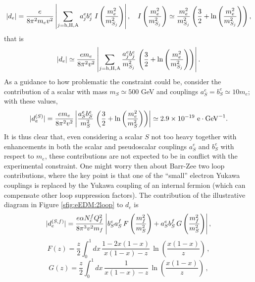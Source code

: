 \documentclass[12pt,a4paper]{article}
\begin{document}
\begin{equation}\label{eq:eEDM:1loop:00}
 \abs{d_e}=\frac{e}{8\pi^2m_e\vev{}^2}\ABS{\sum_{j=\nh,\nH,\nA}a_j^eb_j^e\ I\left(\frac{m_e^2}{m_{S_j}^2}\right)},
 \quad I\left(\frac{m_e^2}{m_{S_j}^2}\right)\simeq \frac{m_e^2}{m_{S_j}^2}\left(\frac{3}{2}+\ln\left(\frac{m_e^2}{m_{S_j}^2}\right)\right),
\end{equation}
that is 
\begin{equation}\label{eq:eEDM:1loop:01}
 |d_e|\simeq\frac{em_e}{8\pi^2v_{}^2}\left|\sum_{j={\rm h},{\rm H},{\rm A}}\frac{a_j^eb_j^e}{m_{S_j}^2}\,\left(\frac{3}{2}+\ln\left(\frac{m_e^2}{m_{S_j}^2}\right)\right)\right|.
\end{equation}
As a guidance to how problematic the constraint could be, consider the contribution of a scalar with mass $m_{S}\simeq 500$ GeV and couplings $a_S^e=b_S^e\simeq 10m_e$; with these values,
\begin{equation}\label{eq:eEDM:1loop:02}
 |d_e^{(S)}|=\frac{em_e}{8\pi^2v_{}^2}\left|\frac{a_S^eb_S^e}{m_{S}^2}\,\left(\frac{3}{2}+\ln\left(\frac{m_e^2}{m_{S}^2}\right)\right)\right|\simeq 2.9\times 10^{-19}\ \text{e}\cdot\text{GeV}^{-1}.
\end{equation}
It is thus clear that, even considering a scalar $S$ not too heavy together with enhancements in both the scalar and pseudoscalar couplings $a_S^e$ and $b_S^e$ with respect to $m_e$, these contributions are not expected to be in conflict with the experimental constraint. One might worry then about Barr-Zee two loop contributions, where the key point is that one of the ``small'' electron Yukawa couplings is replaced by the Yukawa coupling of an internal fermion (which can compensate other loop suppression factors). The contribution of the illustrative diagram in Figure \ref{sfig:eEDM:2loop} to $d_e$ is
\begin{equation}\label{eq:eEDM:2loop:00}
 |d_e^{(S,f)}|=\frac{e\alpha N_c^fQ_f^2}{8\pi^3v_{}^2m_f}\left|b^e_Sa^f_S\,F\left(\frac{m_f^2}{m_S^2}\right)+a^e_Sb^f_S\,G\left(\frac{m_f^2}{m_S^2}\right)\right|,
\end{equation}
%
\begin{equation}
F(z)=\frac{z}{2}\int_0^1 dx\,\frac{1-2x(1-x)}{x(1-x)-z}\,\ln\left(\frac{x(1-x)}{z}\right)\,,
\end{equation}
%
\begin{equation}
G(z)=\frac{z}{2}\int_0^1 dx\,\frac{1}{x(1-x)-z}\,\ln\left(\frac{x(1-x)}{z}\right)\,,
\end{equation}
%
\end{document}
